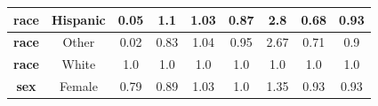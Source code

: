 \documentclass[oneside,openright,titlepage,numbers=noenddot,openany,headinclude,footinclude=true,
cleardoublepage=empty,abstractoff,BCOR=5mm,paper=a4,fontsize=12pt,main=spanish]{scrreprt}
\begin{document}
\begin{table}[H]
{\begin{tabular}{|c|c|c|c|c|c|c|c|c|}
\textbf{race}                                                     & Hispanic                                                           & {\color[HTML]{FE0000} 0.05}                                      & {\color[HTML]{32CB00} 1.1}                                       & {\color[HTML]{32CB00} 1.03}                                      & {\color[HTML]{32CB00} 0.87}                                      & {\color[HTML]{FE0000} 2.8}                                       & {\color[HTML]{FE0000} 0.68}                                      & {\color[HTML]{32CB00} 0.93}                                      \\ \hline
\textbf{race}                                                     & Other                                                              & {\color[HTML]{FE0000} 0.02}                                      & {\color[HTML]{32CB00} 0.83}                                      & {\color[HTML]{32CB00} 1.04}                                      & {\color[HTML]{32CB00} 0.95}                                      & {\color[HTML]{FE0000} 2.67}                                      & {\color[HTML]{FE0000} 0.71}                                      & {\color[HTML]{32CB00} 0.9}                                       \\ \hline
\textbf{race}                                                     & White                                                              & {\color[HTML]{3166FF} 1.0}                                       & {\color[HTML]{3166FF} 1.0}                                       & {\color[HTML]{3166FF} 1.0}                                       & {\color[HTML]{3166FF} 1.0}                                       & {\color[HTML]{3166FF} 1.0}                                       & {\color[HTML]{3166FF} 1.0}                                       & {\color[HTML]{3166FF} 1.0}                                       \\ \hline
\textbf{sex}                                                      & Female                                                             & {\color[HTML]{FE0000} 0.79}                                      & {\color[HTML]{32CB00} 0.89}                                      & {\color[HTML]{32CB00} 1.03}                                      & {\color[HTML]{32CB00} 1.0}                                       & {\color[HTML]{FE0000} 1.35}                                      & {\color[HTML]{32CB00} 0.93}                                      & {\color[HTML]{32CB00} 0.93}                                      \\ \hline

\end{tabular}}
\end{table}
\end{document}

